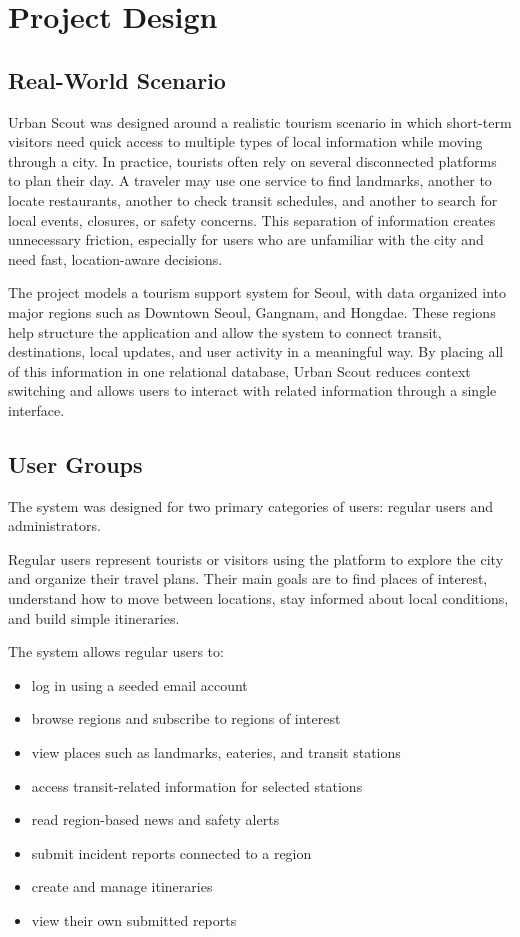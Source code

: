 \section{Project Design}

\subsection{Real-World Scenario}

Urban Scout was designed around a realistic tourism scenario in which short-term visitors need quick access to multiple types of local information while moving through a city. In practice, tourists often rely on several disconnected platforms to plan their day. A traveler may use one service to find landmarks, another to locate restaurants, another to check transit schedules, and another to search for local events, closures, or safety concerns. This separation of information creates unnecessary friction, especially for users who are unfamiliar with the city and need fast, location-aware decisions.

The project models a tourism support system for Seoul, with data organized into major regions such as Downtown Seoul, Gangnam, and Hongdae. These regions help structure the application and allow the system to connect transit, destinations, local updates, and user activity in a meaningful way. By placing all of this information in one relational database, Urban Scout reduces context switching and allows users to interact with related information through a single interface.

\subsection{User Groups}

The system was designed for two primary categories of users: regular users and administrators.


Regular users represent tourists or visitors using the platform to explore the city and organize their travel plans. Their main goals are to find places of interest, understand how to move between locations, stay informed about local conditions, and build simple itineraries.

The system allows regular users to:
\begin{itemize}
    \item log in using a seeded email account
    \item browse regions and subscribe to regions of interest
    \item view places such as landmarks, eateries, and transit stations
    \item access transit-related information for selected stations
    \item read region-based news and safety alerts
    \item submit incident reports connected to a region
    \item create and manage itineraries
    \item view their own submitted reports
\end{itemize}

